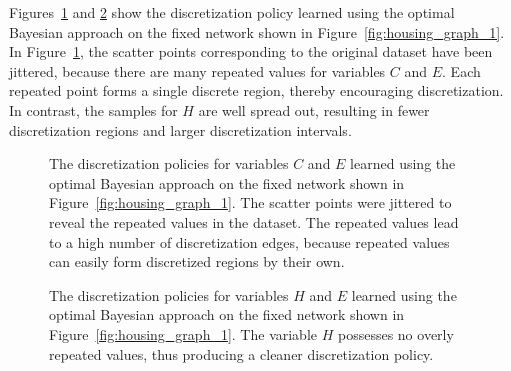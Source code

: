 \begin{table}
  \centering
  \caption{
    Discretization policy summary of the Housing dataset based on the fixed network structure shown in Figure~\ref{fig:housing_graph_1}.
    The first twelve rows show the numbers of intervals after discretization by each method.
    The last row is the mean cross-validated log-likelihood of the dataset based on the discretization results.
    The heuristic method is over-sensitive  and discretizes some variables into too many intervals.
    The MDL method is less sensitive and on many cases does not produce any discretization intervals.
    The optimal Bayesian approach produces a reasonable number of discretization edges.
  }
  \scalebox{1.0}{}
  \label{table:housing_disc_table_1}
\end{table}

Figures~\ref{fig:housing_exp1_distr_3_5} and \ref{fig:housing_exp1_distr_8_5} show the discretization policy learned using the optimal Bayesian approach on the fixed network shown in Figure~\ref{fig:housing_graph_1}.
In Figure~\ref{fig:housing_exp1_distr_3_5}, the scatter points corresponding to the original dataset have been jittered, because there are many repeated values for variables $C$ and $E$.
Each repeated point forms a single discrete region, thereby encouraging discretization.
In contrast, the samples for $H$ are well spread out, resulting in fewer discretization regions and larger discretization intervals.

\begin{figure}[ht]
  \centering
  
  \caption{
    The discretization policies for variables $C$ and $E$ learned using the optimal Bayesian approach on the fixed network shown in Figure~\ref{fig:housing_graph_1}.
    The scatter points were jittered to reveal the repeated values in the dataset.
    The repeated values lead to a high number of discretization edges, because repeated values can easily form discretized regions by their own.
  }
  \label{fig:housing_exp1_distr_3_5}
\end{figure}

\begin{figure}[ht]
  \centering
  
  \caption{
    The discretization policies for variables $H$ and $E$ learned using the optimal Bayesian approach on the fixed network shown in Figure~\ref{fig:housing_graph_1}.
    The variable $H$ possesses no overly repeated values, thus producing a cleaner discretization policy.
  }
  \label{fig:housing_exp1_distr_8_5}
\end{figure}

